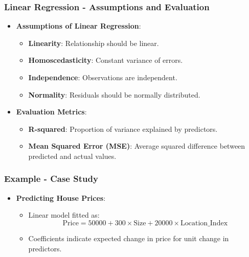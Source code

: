 \documentclass[aspectratio=169]{beamer}
\begin{document}
\begin{frame}[fragile]
    \frametitle{Linear Regression - Assumptions and Evaluation}
    \begin{itemize}
        \item \textbf{Assumptions of Linear Regression}:
        \begin{itemize}
            \item \textbf{Linearity}: Relationship should be linear.
            \item \textbf{Homoscedasticity}: Constant variance of errors.
            \item \textbf{Independence}: Observations are independent.
            \item \textbf{Normality}: Residuals should be normally distributed.
        \end{itemize}
        \item \textbf{Evaluation Metrics}:
        \begin{itemize}
            \item \textbf{R-squared}: Proportion of variance explained by predictors.
            \item \textbf{Mean Squared Error (MSE)}: Average squared difference between predicted and actual values.
        \end{itemize}
    \end{itemize}
\end{frame}

\begin{frame}[fragile]
    \frametitle{Example - Case Study}
    \begin{itemize}
        \item \textbf{Predicting House Prices}:
        \begin{itemize}
            \item Linear model fitted as:
            \begin{equation}
                \text{Price} = 50000 + 300 \times \text{Size} + 20000 \times \text{Location\_Index}
            \end{equation}
            \item Coefficients indicate expected change in price for unit change in predictors.
        \end{itemize}
    \end{itemize}
\end{frame}
\end{document}
